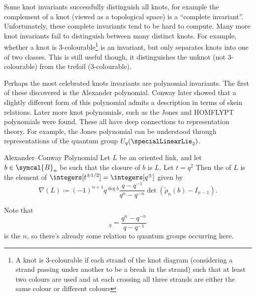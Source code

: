 \documentclass[fleqn]{NotesClass}
\newcommand{\braid}{\symcal{B}}
\begin{document}
    Some knot invariants successfully distinguish all knots, for example the complement of a knot (viewed as a topological space) is a \enquote{complete invariant}.
    Unfortunately, these complete invariants tend to be hard to compute.
    Many more knot invariants fail to distinguish between many distinct knots.
    For example, whether a knot is 3-colourable\footnote{A knot is 3-colourable if each strand of the knot diagram (considering a strand passing under another to be a break in the strand) such that at least two colours are used and at each crossing all three strands are either the same colour or different colours} is an invariant, but only separates knots into one of two classes.
    This is still useful though, it distinguishes the unknot (not 3-colourable) from the trefoil (3-colourable).
    
    Perhaps the most celebrated knots invariants are polynomial invariants.
    The first of these discovered is the Alexander polynomial.
    Conway later showed that a slightly different form of this polynomial admits a description in terms of skein relations.
    Later more knot polynomials, such as the Jones and HOMFLYPT polynomials were found.
    These all have deep connections to representation theory.
    For example, the Jones polynomial can be understood through representations of the quantum group \(U_q(\specialLinearLie_2)\).
    
    \begin{dfn}{Alexander--Conway Polynomial}{}
        Let \(L\) be an oriented link, and let \(b \in \braid_n\) be such that the closure of \(b\) is \(L\).
        Let \(t = q^2\)
        Then the  of \(L\) is the element of \(\integers[t^{\pm 1/2}] = \integers[q^{\pm}]\) given by
        \begin{equation}
            \nabla(L) \coloneq (-1)^{n+1} q^{\deg b} \frac{q - q^{-1}}{q^n - q^{-n}} \det(\tilde{\rho}_n(b) - I_{n-1}).
        \end{equation}
    \end{dfn}
    
    Note that
    \begin{equation}
        [n]_q = \frac{q^n - q^{-n}}{q - q^{-1}}
    \end{equation}
    is the  \(n\), so there's already some relation to quantum groups occurring here.
    
\end{document}
